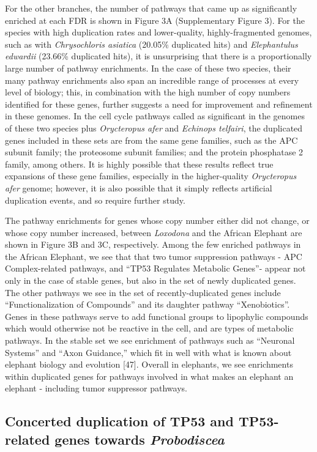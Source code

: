 \documentclass[]{elsarticle} %
\begin{document}
For the other branches, the number of pathways that came up as
significantly enriched at each FDR is shown in Figure 3A (Supplementary
Figure 3). For the species with high duplication rates and
lower-quality, highly-fragmented genomes, such as with
\emph{Chrysochloris asiatica} (20.05\% duplicated hits) and
\emph{Elephantulus edwardii} (23.66\% duplicated hits), it is
unsurprising that there is a proportionally large number of pathway
enrichments. In the case of these two species, their many pathway
enrichments also span an incredible range of processes at every level of
biology; this, in combination with the high number of copy numbers
identified for these genes, further suggests a need for improvement and
refinement in these genomes. In the cell cycle pathways called as
significant in the genomes of these two species plus \emph{Orycteropus
afer} and \emph{Echinops telfairi}, the duplicated genes included in
these sets are from the same gene families, such as the APC subunit
family; the proteosome subunit families; and the protein phosphatase 2
family, among others. It is highly possible that these results reflect
true expansions of these gene families, especially in the higher-quality
\emph{Orycteropus afer} genome; however, it is also possible that it
simply reflects artificial duplication events, and so require further
study.

The pathway enrichments for genes whose copy number either did not
change, or whose copy number increased, between \emph{Loxodona} and the
African Elephant are shown in Figure 3B and 3C, respectively. Among the
few enriched pathways in the African Elephant, we see that that two
tumor suppression pathways - APC Complex-related pathways, and ``TP53
Regulates Metabolic Genes''- appear not only in the case of stable
genes, but also in the set of newly duplicated genes. The other pathways
we see in the set of recently-duplicated genes include
``Functionalization of Compounds'' and its daughter pathway
``Xenobiotics''. Genes in these pathways serve to add functional groups
to lipophylic compounds which would otherwise not be reactive in the
cell, and are types of metabolic pathways. In the stable set we see
enrichment of pathways such as ``Neuronal Systems'' and ``Axon
Guidance,'' which fit in well with what is known about elephant biology
and evolution {[}47{]}. Overall in elephants, we see enrichments within
duplicated genes for pathways involved in what makes an elephant an
elephant - including tumor suppressor pathways.

\hypertarget{concerted-duplication-of-tp53-and-tp53-related-genes-towards-probodiscea}{%
\subsection*{\texorpdfstring{Concerted duplication of TP53 and
TP53-related genes towards
\emph{Probodiscea}}{Concerted duplication of TP53 and TP53-related genes towards Probodiscea}}\label{concerted-duplication-of-tp53-and-tp53-related-genes-towards-probodiscea}}
\end{document}
